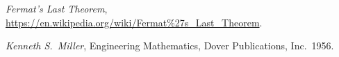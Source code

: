 \documentclass[SecEq,CM,GP]{degruyter-crelle} %
\theoremstyle{plain}
\theoremstyle{definition}
\begin{document}
\begin{thebibliography}{9}



\textit{Fermat's Last Theorem},
\url{https://en.wikipedia.org/wiki/Fermat%27s_Last_Theorem}.










\textit{Kenneth S.~Miller},
Engineering Mathematics, Dover Publications, Inc.\ 1956.




\end{thebibliography}
\end{document}
